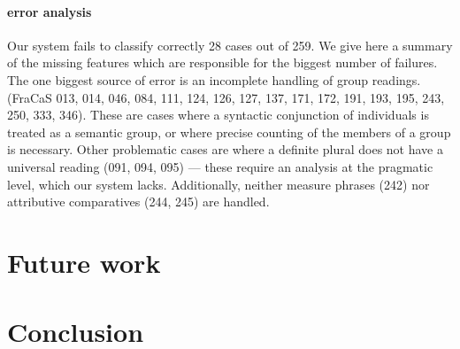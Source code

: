 \documentclass[11pt]{article}
\begin{document}
\paragraph{error analysis}
Our system fails to classify correctly 28 cases out of 259.  We give
here a summary of the missing features which are responsible for the
biggest number of failures. The one biggest source of error is an
incomplete handling of group readings. (FraCaS
013, 014, 046, 084, 111, 124, 126, 127, 137, 171, 172, 191, 193, 195, 243, 250, 333, 346). These
are cases where a syntactic conjunction of individuals is treated as a
semantic group, or where precise counting of the members of a group is
necessary.  Other problematic cases are where a definite plural does
not have a universal reading (091, 094, 095) --- these require an
analysis at the pragmatic level, which our system lacks. Additionally,
neither measure phrases (242) nor attributive comparatives (244, 245)
are handled.


\section{Future work}
\section{Conclusion}




\end{document}
